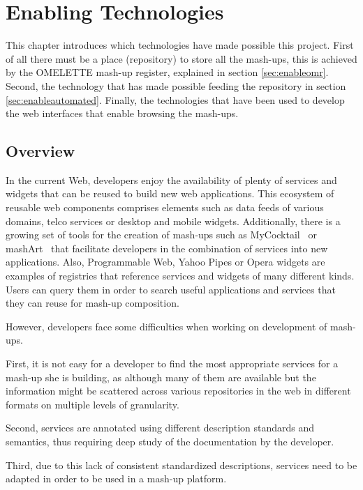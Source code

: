 
\chapter{Enabling Technologies}
\label{chap:enabling_technologies}
\begin{chapterintro}
This chapter introduces which technologies have made possible this project. First of all there must be a place (repository) to store all the mash-ups, this is achieved by the OMELETTE mash-up register, explained in section \ref{sec:enableomr}. Second, the technology that has made possible feeding the repository in section \ref{sec:enableautomated}. Finally, the technologies that have been used to develop the web interfaces that enable browsing the mash-ups.
\end{chapterintro}

\cleardoublepage
\section{Overview}
In the current Web, developers enjoy the availability of plenty of services and widgets that can be reused to build new web applications. This ecosystem of reusable web components comprises elements such as data feeds of various domains, telco services or desktop and mobile widgets. Additionally, there is a growing set of tools for the creation of mash-ups such as MyCocktail~\cite{iglesias2011combining} or mashArt~\cite{daniel2009hosted} that facilitate developers in the combination of services into new applications. Also, Programmable Web, Yahoo Pipes or Opera widgets are examples of registries that reference services and widgets of many different kinds. Users can query them in order to search useful applications and services that they can reuse for mash-up composition.

However, developers face some difficulties when working on development of mash-ups. 

First, it is not easy for a developer to find the most appropriate services for a mash-up she is building, as although many of them are available but the information might be scattered across various repositories in the web in different formats on multiple levels of granularity.

Second, services are annotated using different description standards and semantics, thus requiring deep study of the documentation by the developer.

Third, due to this lack of consistent standardized descriptions, services need to be adapted in order to be used in a mash-up platform. 


